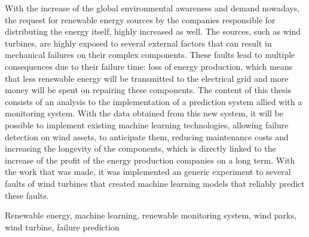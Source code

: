 



With the increase of the global environmental awareness and demand nowadays, the request for renewable energy sources by the companies responsible for distributing the energy itself, highly increased as well. The sources, such as wind turbines, are highly exposed to several external factors that can result in mechanical failures on their complex components. These faults lead to multiple consequences due to their failure time: loss of energy production, which means that less renewable energy will be transmitted to the electrical grid and more money will be spent on repairing these components. The content of this thesis consists of an analysis to the implementation of a prediction system allied with a monitoring system. With the data obtained from this new system, it will be possible to implement existing machine learning technologies, allowing failure detection on wind assets, to anticipate them, reducing maintenance costs and increasing the longevity of the components, which is directly linked to the increase of the profit of the energy production companies on a long term.
With the work that was made, it was implemented an generic experiment to several faults of wind turbines that created machine learning models that reliably predict these faults.

\begin{keywords}
Renewable energy, machine learning, renewable monitoring system, wind parks, wind turbine, failure prediction
\end{keywords} 
